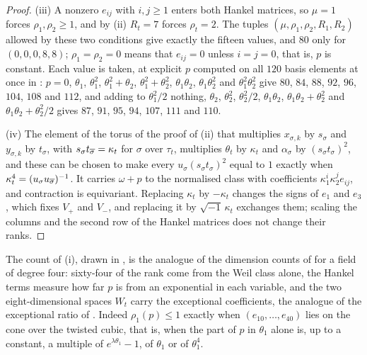 \begin{proof}
(iii) A nonzero $e_{ij}$ with $i,j\ge1$ enters both Hankel matrices, so
$\mu=1$ forces $\rho_{1},\rho_{2}\ge1$, and by (ii) $R_{t}=7$ forces
$\rho_{t}=2$. The tuples $(\mu,\rho_{1},\rho_{2},R_{1},R_{2})$ allowed by
these two conditions give exactly the fifteen values, and $80$ only for
$(0,0,0,8,8)$; $\rho_{1}=\rho_{2}=0$ means that $e_{ij}=0$ unless $i=j=0$,
that is, $p$ is constant. Each value is taken, at explicit $p$ computed on
all $120$ basis elements at once in \cite{BMB26}: $p=0$, $\theta_{1}$,
$\theta_{1}^{2}$, $\theta_{1}^{2}+\theta_{2}$, $\theta_{1}^{2}+
\theta_{2}^{2}$, $\theta_{1}\theta_{2}$, $\theta_{1}\theta_{2}^{2}$ and
$\theta_{1}^{2}\theta_{2}^{2}$ give $80$, $84$, $88$, $92$, $96$, $104$, $108$
and $112$, and adding to $\theta_{1}^{2}/2$ nothing, $\theta_{2}$,
$\theta_{2}^{2}$, $\theta_{2}^{2}/2$, $\theta_{1}\theta_{2}$,
$\theta_{1}\theta_{2}+\theta_{2}^{2}$ and $\theta_{1}\theta_{2}+
\theta_{2}^{2}/2$ gives $87$, $91$, $95$, $94$, $107$, $111$ and $110$.

(iv) The element of the torus of the proof of (ii)
that multiplies $x_{\sigma,k}$ by $s_{\sigma}$ and $y_{\sigma,k}$ by
$t_{\sigma}$, with $s_{\sigma}t_{\overline{\sigma}}=\kappa_{t}$ for $\sigma$ over
$\tau_{t}$, multiplies $\theta_{t}$ by $\kappa_{t}$ and $\alpha_{\sigma}$ by
$(s_{\sigma}t_{\sigma})^{2}$, and these can be chosen to make every
$u_{\sigma}(s_{\sigma}t_{\sigma})^{2}$ equal to $1$ exactly when
$\kappa_{t}^{4}=(u_{\sigma}u_{\overline{\sigma}})^{-1}$. It carries $\omega+p$ to the
normalised class with coefficients $\kappa_{1}^{i}\kappa_{2}^{j}e_{ij}$, and
contraction is equivariant. Replacing $\kappa_{t}$ by $-\kappa_{t}$ changes the
signs of $e_{1}$ and $e_{3}$, which fixes $V_{+}$ and $V_{-}$, and replacing
it by $\sqrt{-1}\,\kappa_{t}$ exchanges them; scaling the columns and the
second row of the Hankel matrices does not change their ranks.
\end{proof}

The count of (i), drawn in , is the analogue of the
dimension counts of  for a field of degree four: sixty-four of the rank
come from the Weil class alone, the Hankel terms measure how far $p$ is from
an exponential in each variable, and the two eight-dimensional spaces
$W_{t}$ carry the exceptional coefficients, the analogue of the exceptional
ratio of . Indeed $\rho_{1}(p)\le1$ exactly when
$(e_{10},\dots,e_{40})$ lies on the cone over the twisted cubic, that is,
when the part of $p$ in $\theta_{1}$ alone is, up to a constant, a multiple
of $e^{\lambda\theta_{1}}-1$, of $\theta_{1}$ or of $\theta_{1}^{4}$.

